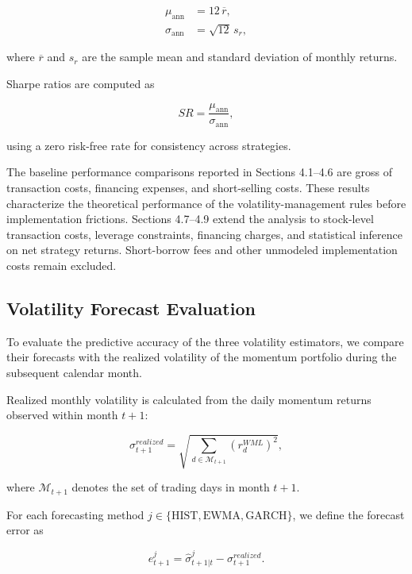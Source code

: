 \documentclass[11pt]{article}
\begin{document}
\begin{align}
\mu_{\mathrm{ann}}
&= 12\,\overline{r}, \\
\sigma_{\mathrm{ann}}
&= \sqrt{12}\,s_r,
\end{align}

where $\overline{r}$ and $s_r$ are the sample
mean and standard deviation of monthly returns.

Sharpe ratios are computed as

\begin{equation}
SR
=
\frac{\mu_{\mathrm{ann}}}
{\sigma_{\mathrm{ann}}},
\end{equation}

using a zero risk-free rate for consistency
across strategies.

The baseline performance comparisons reported in Sections 4.1--4.6 are gross of transaction costs, financing expenses, and short-selling costs. These results characterize the theoretical performance of the volatility-management rules before implementation frictions. Sections 4.7--4.9 extend the analysis to stock-level transaction costs, leverage constraints, financing charges, and statistical inference on net strategy returns. Short-borrow fees and other unmodeled implementation costs remain excluded.


\subsection{Volatility Forecast Evaluation}

To evaluate the predictive accuracy of the three volatility
estimators, we compare their forecasts with the realized
volatility of the momentum portfolio during the subsequent
calendar month.

Realized monthly volatility is calculated from the daily
momentum returns observed within month $t+1$:

\begin{equation}
\sigma_{t+1}^{realized}
=
\sqrt{
\sum_{d \in \mathcal{M}_{t+1}}
(r_d^{WML})^2
},
\label{eq:realized_vol}
\end{equation}

where $\mathcal{M}_{t+1}$ denotes the set of trading days
in month $t+1$.

For each forecasting method
$j \in \{\mathrm{HIST},\mathrm{EWMA},\mathrm{GARCH}\}$,
we define the forecast error as

\begin{equation}
e_{t+1}^{j}
=
\widehat{\sigma}_{t+1|t}^{j}
-
\sigma_{t+1}^{realized}.
\end{equation}
\end{document}
